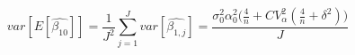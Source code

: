 \begin{equation}
var[E[\hat{\beta_{10}}]] = \frac{1}{J^2}\sum\limits_{j=1}^{J}{var[\hat{\beta_{1,j}}]} = \frac{\sigma_0^2\alpha_0^2\Big(\frac{4}{n} + CV_{\alpha}^2(\frac{4}{n} + \delta^2)\Big)}{J}
\end{equation}